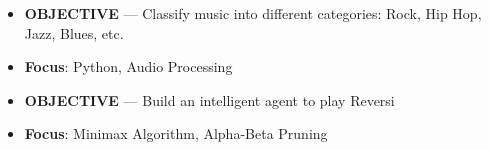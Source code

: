 \documentclass[10pt,a4paper]{altacv}
\begin{document}

\begin{itemize}
	\item \textbf{OBJECTIVE} --- Classify music into different categories: Rock, Hip Hop, Jazz, Blues, etc.
	\item \textbf{Focus}: Python, Audio Processing
\end{itemize}


\begin{itemize}
	\item \textbf{OBJECTIVE} --- Build an intelligent agent to play Reversi
	\item \textbf{Focus}: Minimax Algorithm, Alpha-Beta Pruning
\end{itemize}


\end{document}
